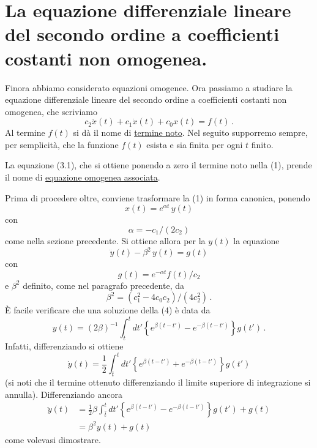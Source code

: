 \documentclass[11pt, a4paper]{book}
\numberwithin{equation}{section}
\begin{document}
\section[edo secondo ordine lineare a coeff. costanti non omogenea]{La equazione differenziale lineare del secondo ordine a coefficienti costanti non omogenea.}

Finora abbiamo considerato equazioni omogenee. Ora passiamo a studiare la
equazione differenziale lineare del secondo ordine a coefficienti costanti non
omogenea, che scriviamo
\begin{equation}
    c_2 \ddot{x}(t) + c_1 \dot{x}(t) + c_0 x(t) = f(t) \,.
\end{equation}
Al termine $f(t)$ si dà il nome di \underline{termine noto}. Nel seguito supporremo
sempre, per semplicità, che la funzione $f(t)$ esista e sia finita per ogni $t$ finito.

La equazione (3.1), che si ottiene ponendo a zero il termine noto nella (1),
prende il nome di \underline{equazione omogenea associata}.

Prima di procedere oltre, conviene trasformare la (1) in forma canonica,
ponendo
\begin{equation}
    x(t) = e^{\alpha t} \, y(t)
\end{equation}
con
\begin{equation}
    \alpha = -c_1 / (2 c_2)
\end{equation}
come nella sezione precedente. Si ottiene allora per la $y(t)$ la equazione
\begin{equation}
    \ddot{y}(t) - \beta^2 \, y(t) = g(t)
\end{equation}
con
\begin{equation}
    g(t) = e^{-\alpha t} f(t) / c_2
\end{equation}
e $\beta^2$ definito, come nel paragrafo precedente, da
\begin{equation}
    \beta^2 = (c_1^2 - 4 c_0 c_2) / (4 c_2^2) \,.
\end{equation}
È facile verificare che una soluzione della (4) è data da
\begin{equation}
    y(t) = (2\beta)^{-1} \int_{\bar{t}}^{t} dt' \left\{ e^{\beta(t-t')} - e^{-\beta(t-t')} \right\} g(t') \,.
\end{equation}
Infatti, differenziando si ottiene
\begin{equation}
    \dot{y}(t) = \frac{1}{2} \int_{\bar{t}}^{t} dt' \left\{ e^{\beta(t-t')} + e^{-\beta(t-t')} \right\} g(t')
\end{equation}
(si noti che il termine ottenuto differenziando il limite superiore di integrazione
si annulla). Differenziando ancora
\begin{align}
    \ddot{y}(t) &= \frac{1}{2} \beta \int_{\bar{t}}^{t} dt' \left\{ e^{\beta(t-t')} - e^{-\beta(t-t')} \right\} g(t') + g(t) \tag{9a} \\
    &= \beta^2 y(t) + g(t) \tag{9b}
\end{align}
come volevasi dimostrare.
\end{document}
